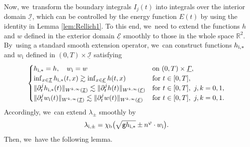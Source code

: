 \documentclass[JEP,XML,SOM,Unicode,NoFloatCountersInSection,published]{cedram}
\newcommand{\gr}{{\mathtt g}}
\newcommand{\R}{{\mathbb R}}
\newcommand{\dt}{\partial_t}
\newcommand{\cI}{{\mathcal I}}
\newcommand{\cE}{{\mathcal E}}
\newcommand{\ul}[1]{\underline{#1}}
\newcommand{\itGamma}{\mathit{\Gamma}}
\theoremstyle{definition}
\begin{document}
Now, we~transform the boundary integrals $I_j(t)$ into integrals over the interior domain $\ul{\cI}$, which can be controlled by the energy function $E(t)$
by using the identity in Lemma \ref{lem:Rellich1}.
To this end, we~need to extend the functions $h$ and $w$ defined in the exterior domain $\ul{\cE}$ smoothly to those in the whole space $\R^2$. By~using a standard smooth extension operator, we~can construct functions $h_{{\rm i},*}$ and $w_\mathrm{i}$ defined in $(0,T)\times\ul{\cI}$ satisfying
\begin{equation}\label{Ext2}
\begin{cases}
h_{{\rm i},*}=h, \quad w_\mathrm{i}=w &\text{on } (0,T)\times\ul{\itGamma}, \\
\inf_{x\in\ul{\cI}}h_{{\rm i},*}(t,x) \gtrsim \inf_{x\in\ul{\cE}}h(t,x) &\text{for } t\in[0,T], \\
\|\dt^jh_{{\rm i},*}(t)\|_{W^{k,\infty}(\ul{\cI})} \lesssim \|\dt^jh(t)\|_{W^{k,\infty}(\ul{\cE})} &\text{for } t\in[0,T], \ j,k=0,1, \\
\|\dt^jw_\mathrm{i}(t)\|_{W^{k,\infty}(\ul{\cI})} \lesssim \|\dt^jw(t)\|_{W^{k,\infty}(\ul{\cE})} &\text{for } t\in[0,T], \ j,k=0,1.
\end{cases}
\end{equation}
Accordingly, we~can extend $\lambda_{\pm}$ smoothly by
\[
\lambda_{{\rm i},\pm} = \chi_\mathrm{b} \bigl(\sqrt{\gr h_{{\rm i},*}}\pm n^\varphi\cdot w_\mathrm{i} \bigr).
\]
Then, we~have the following lemma.
\end{document}
